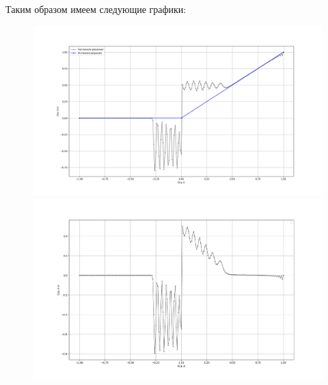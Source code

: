 \documentclass[a4paper,12pt]{article}
\begin{document}
\newpage
Таким образом имеем следующие графики:
\begin{figure}[h]
    \begin{center}
    \begin{minipage}[h]{0.49\linewidth}
    \includegraphics[width=1\linewidth]{Figure_9.png}
    \end{minipage}
    \hfill
    \begin{minipage}[h]{0.5\linewidth}
    \includegraphics[width=1\linewidth]{Figure_10.png}
    \end{minipage}
    \hfill
    \end{center}
\end{figure}
\end{document}
